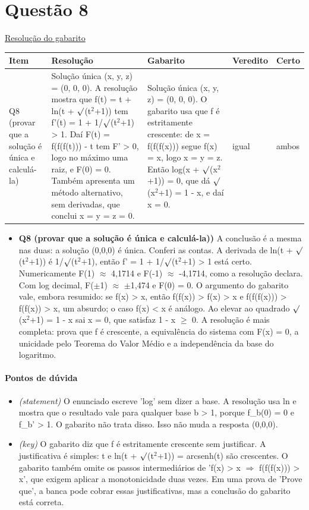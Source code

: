 \documentclass{article}%
\begin{document}
\section*{Questão 8}%
\href{https://poliedroresolve.sistemapoliedro.com.br/vestibulares/ime/2026/ime-2-fase-dia-1-23-10-2025-2-fase-dia-1/dissertativa-8-matematica-2-fase-dia-1-ime-2026}{Resolução do gabarito}\par\smallskip%
\begin{longtable}{@{}p{} p{} p{} p{} p{}@{}}\toprule Item & Resolução & Gabarito & Veredito & Certo \\ \midrule
Q8 (provar que a solução é única e calculá{-}la) & Solução única (x, y, z) = (0, 0, 0). A resolução mostra que f(t) = t + ln(t + $\surd$(t$^2$+1)) tem f'(t) = 1 + 1/$\surd$(t$^2$+1) > 1. Daí F(t) = f(f(f(t))) - t tem F' > 0, logo no máximo uma raiz, e F(0) = 0. Também apresenta um método alternativo, sem derivadas, que conclui x = y = z = 0. & Solução única (x, y, z) = (0, 0, 0). O gabarito usa que f é estritamente crescente: de x = f(f(f(x))) segue f(x) = x, logo x = y = z. Então log(x + $\surd$(x$^2$+1)) = 0, que dá $\surd$(x$^2$+1) = 1 - x, e daí x = 0. & igual & ambos \\
\bottomrule\end{longtable}%
\begin{itemize}%
\item%
\textbf{Q8 (provar que a solução é única e calculá{-}la))} A conclusão é a mesma nas duas: a solução (0,0,0) é única. Conferi as contas. A derivada de ln(t + $\surd$(t$^2$+1)) é 1/$\surd$(t$^2$+1), então f' = 1 + 1/$\surd$(t$^2$+1) > 1 está certo. Numericamente F(1) $\approx$ 4,1714 e F(-1) $\approx$ -4,1714, como a resolução declara. Com log decimal, F($\pm$1) $\approx$ $\pm$1,474 e F(0) = 0. O argumento do gabarito vale, embora resumido: se f(x) > x, então f(f(x)) > f(x) > x e f(f(f(x))) > f(f(x)) > x, um absurdo; o caso f(x) < x é análogo. Ao elevar ao quadrado $\surd$(x$^2$+1) = 1 - x sai x = 0, que satisfaz 1 - x $\geq$ 0. A resolução é mais completa: prova que f é crescente, a equivalência do sistema com F(x) = 0, a unicidade pelo Teorema do Valor Médio e a independência da base do logaritmo.%
\end{itemize}%
\paragraph{Pontos de dúvida}%
\begin{itemize}%
\item%
\textit{(statement)} O enunciado escreve 'log' sem dizer a base. A resolução usa ln e mostra que o resultado vale para qualquer base b > 1, porque f\_b(0) = 0 e f\_b' > 1. O gabarito não trata disso. Isso não muda a resposta (0,0,0).%
\item%
\textit{(key)} O gabarito diz que f é estritamente crescente sem justificar. A justificativa é simples: t e ln(t + $\surd$(t$^2$+1)) = arcsenh(t) são crescentes. O gabarito também omite os passos intermediários de 'f(x) > x $\Rightarrow$ f(f(f(x))) > x', que exigem aplicar a monotonicidade duas vezes. Em uma prova de 'Prove que', a banca pode cobrar essas justificativas, mas a conclusão do gabarito está correta.%
\end{itemize}%
\end{document}
